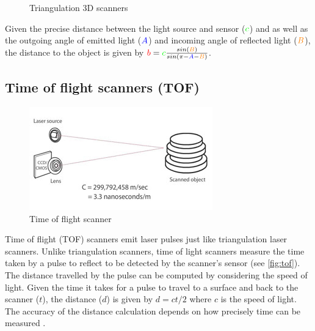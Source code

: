 \begin{figure}[H]
\begin{subfigure}[b]{.33\textwidth}
		\caption{}
	\end{subfigure}
	\caption{Triangulation 3D scanners \protect\footnotemark}
	\label{fig:triangulation-scanners}
\end{figure}

Given the precise distance between the light source and sensor ($\begingroup\color{green}c\endgroup$) and as well as the outgoing angle of emitted light ($\begingroup\color{blue}A\endgroup$) and incoming angle of reflected light ($\begingroup\color{orange}B\endgroup$), the distance to the object is given by $\begingroup\color{red}b\endgroup = \begingroup\color{green}c\endgroup\frac{ sin(\begingroup\color{orange}B\endgroup)}{sin(\pi - \begingroup\color{blue}A\endgroup-\begingroup\color{orange}B\endgroup)}$.

\subsection{Time of flight scanners (TOF)} \label{subsec:tof}

\begin{figure}[ht]
  \centering
  \includegraphics[width=.5\linewidth]{images/pulse-tof}
  \caption[Time of flight scanner]{Time of flight scanner \protect\footnotemark}
  \label{fig:tof}
\end{figure}

Time of flight (TOF) scanners emit laser pulses just like triangulation laser scanners. Unlike triangulation scanners, time of light scanners measure the time taken by a pulse to reflect to be detected by the scanner's sensor (see \autoref{fig:tof}). The distance travelled by the pulse can be computed by considering the speed of light. Given the time it takes for a pulse to travel to a surface and back to the scanner ($t$), the distance ($d$) is given by $d = ct/2$ where $c$ is the speed of light. The accuracy of the distance calculation depends on how precisely time can be measured \cite{Form2014}.

